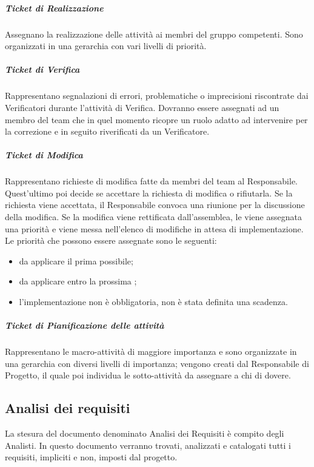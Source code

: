 \subparagraph{Ticket di Realizzazione}
\label{8.4.2}
Assegnano la realizzazione delle attività ai membri del gruppo competenti. Sono organizzati in una gerarchia con vari livelli di priorità.

\subparagraph{Ticket di Verifica}
\label{8.4.3}
Rappresentano segnalazioni di errori, problematiche o imprecisioni riscontrate dai Verificatori durante l'attività di Verifica. Dovranno essere assegnati ad un membro del team che in quel momento ricopre un ruolo adatto ad intervenire per la correzione e in seguito riverificati da un Verificatore.


\subparagraph{Ticket di Modifica}
\label{8.4.4}
Rappresentano richieste di modifica fatte da membri del team al Responsabile. Quest'ultimo poi decide se accettare la richiesta di modifica o rifiutarla. Se la richiesta viene accettata, il Responsabile convoca una riunione per la discussione della modifica. Se la modifica viene rettificata dall'assemblea, le viene assegnata una priorità e viene messa nell'elenco di modifiche in attesa di implementazione.
Le priorità che possono essere assegnate sono le seguenti:
\begin{itemize}
\item {} da applicare il prima possibile;
\item {} da applicare entro la prossima ;
\item {} l'implementazione non è obbligatoria, non è stata definita una scadenza.
\end{itemize}

\subparagraph{Ticket di Pianificazione delle attività}
Rappresentano le macro-attività di maggiore importanza e sono organizzate in una gerarchia con diversi livelli di importanza; vengono creati dal Responsabile di Progetto, il quale poi individua le sotto-attività da assegnare a chi di dovere.

\subsection{Analisi dei requisiti}
\label{6.1}
La stesura del documento denominato Analisi dei Requisiti è compito degli Analisti.
In questo documento verranno trovati, analizzati e catalogati tutti i requisiti, impliciti e non, imposti dal progetto.

